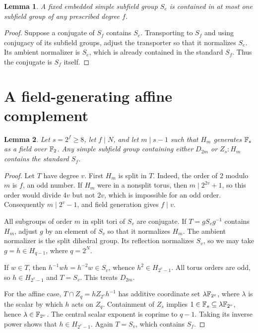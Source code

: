 \documentclass[11pt,a4paper]{article}
\newtheorem{lemma}{Lemma}\newtheorem{theorem}[lemma]{Theorem}
\begin{document}
\begin{lemma}\label{simple}
A fixed embedded simple subfield group $S_e$ is contained in at most
one subfield group of any prescribed degree $f$.
\end{lemma}
\begin{proof}
Suppose a conjugate of $S_f$ contains $S_e$. Transporting to $S_f$ and
using conjugacy of its subfield groups, adjust the transporter so that
it normalizes $S_e$. Its ambient normalizer is $S_e$, which is already
contained in the standard $S_f$. Thus the conjugate is $S_f$ itself.
\end{proof}

\section{A field-generating affine complement}
\begin{lemma}\label{affine}
Let $s=2^f\ge8$, let $f\mid N$, and let $m\mid s-1$ such that $H_m$
generates $\mathbb F_s$ as a field over $\mathbb F_2$. Any simple subfield group
containing either $D_{2m}$ or $Z_s:H_m$ contains the standard $S_f$.
\end{lemma}
\begin{proof}
Let $T$ have degree $v$. First $H_m$ is split in $T$. Indeed, the order
of $2$ modulo $m$ is $f$, an odd number. If $H_m$ were in a nonsplit
torus, then $m\mid 2^{2v}+1$, so this order would divide $4v$ but
not $2v$, which is impossible for an odd order. Consequently
$m\mid2^v-1$, and field generation gives $f\mid v$.

All subgroups of order $m$ in split tori of $S_v$ are conjugate.
If $T=gS_vg^{-1}$ contains $H_m$, adjust $g$ by an element of $S_v$
so that it normalizes $H_m$. The ambient normalizer is the split
dihedral group. Its reflection normalizes $S_v$, so we may take
$g=h\in H_{q-1}$, where $q=2^N$.

If $w\in T$, then $h^{-1}wh=h^{-2}w\in S_v$, whence $h^2\in H_{2^v-1}$.
All torus orders are odd, so $h\in H_{2^v-1}$ and $T=S_v$.
This treats $D_{2m}$.

For the affine case, $T\cap Z_q=hZ_{2^v}h^{-1}$ has additive coordinate
set $\lambda\mathbb F_{2^v}$, where $\lambda$ is the scalar by which $h$ acts
on $Z_q$. Containment of $Z_s$ implies
$1\in\mathbb F_s\subseteq\lambda\mathbb F_{2^v}$, hence $\lambda\in\mathbb F_{2^v}$.
The central scalar exponent is coprime to $q-1$. Taking its inverse
power shows that $h\in H_{2^v-1}$. Again $T=S_v$, which contains $S_f$.
\end{proof}
\end{document}
